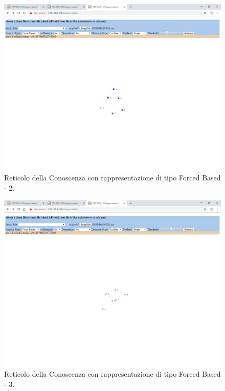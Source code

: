 \noindent
\begin{figure}[H]
\centering
	\includegraphics[width=1\linewidth]{./image/reticoloNonCorretto6.png}
	\caption{Reticolo della Conoscenza con rappresentazione di tipo Forced Based - 2.}
	\label{Reticolo della Conoscenza con rappresentazione di tipo Forced Based - 2.}
\end{figure}
\noindent
\begin{figure}[H]
\centering
	\includegraphics[width=1\linewidth]{./image/reticoloNonCorretto7.png}
	\caption{Reticolo della Conoscenza con rappresentazione di tipo Forced Based - 3.}
	\label{Reticolo della Conoscenza con rappresentazione di tipo Forced Based - 3.}
\end{figure}
